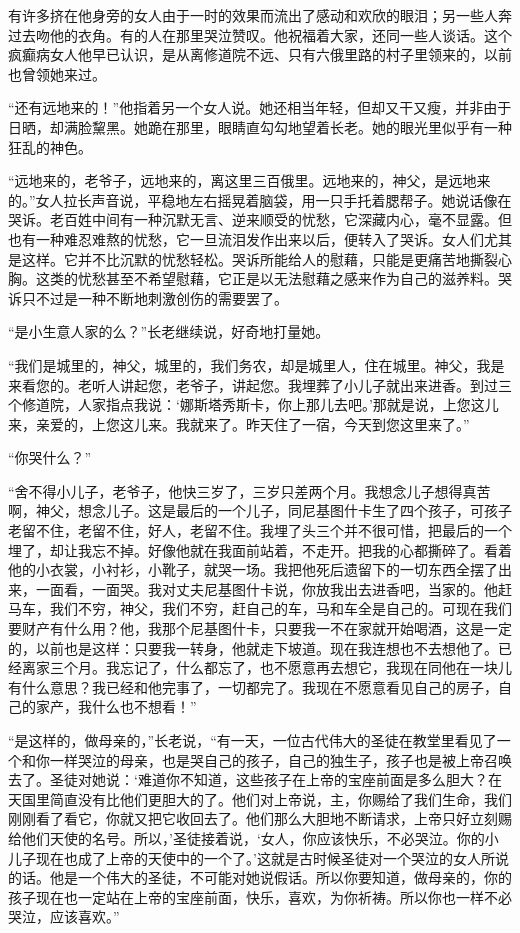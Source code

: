 \par 有许多挤在他身旁的女人由于一时的效果而流出了感动和欢欣的眼泪；另一些人奔过去吻他的衣角。有的人在那里哭泣赞叹。他祝福着大家，还同一些人谈话。这个疯癫病女人他早已认识，是从离修道院不远、只有六俄里路的村子里领来的，以前也曾领她来过。
\par “还有远地来的！”他指着另一个女人说。她还相当年轻，但却又干又瘦，并非由于日晒，却满脸黧黑。她跪在那里，眼睛直勾勾地望着长老。她的眼光里似乎有一种狂乱的神色。
\par “远地来的，老爷子，远地来的，离这里三百俄里。远地来的，神父，是远地来的。”女人拉长声音说，平稳地左右摇晃着脑袋，用一只手托着腮帮子。她说话像在哭诉。老百姓中间有一种沉默无言、逆来顺受的忧愁，它深藏内心，毫不显露。但也有一种难忍难熬的忧愁，它一旦流泪发作出来以后，便转入了哭诉。女人们尤其是这样。它并不比沉默的忧愁轻松。哭诉所能给人的慰藉，只能是更痛苦地撕裂心胸。这类的忧愁甚至不希望慰藉，它正是以无法慰藉之感来作为自己的滋养料。哭诉只不过是一种不断地刺激创伤的需要罢了。
\par “是小生意人家的么？”长老继续说，好奇地打量她。
\par “我们是城里的，神父，城里的，我们务农，却是城里人，住在城里。神父，我是来看您的。老听人讲起您，老爷子，讲起您。我埋葬了小儿子就出来进香。到过三个修道院，人家指点我说：‘娜斯塔秀斯卡，你上那儿去吧。’那就是说，上您这儿来，亲爱的，上您这儿来。我就来了。昨天住了一宿，今天到您这里来了。”
\par “你哭什么？”
\par “舍不得小儿子，老爷子，他快三岁了，三岁只差两个月。我想念儿子想得真苦啊，神父，想念儿子。这是最后的一个儿子，同尼基图什卡生了四个孩子，可孩子老留不住，老留不住，好人，老留不住。我埋了头三个并不很可惜，把最后的一个埋了，却让我忘不掉。好像他就在我面前站着，不走开。把我的心都撕碎了。看着他的小衣裳，小衬衫，小靴子，就哭一场。我把他死后遗留下的一切东西全摆了出来，一面看，一面哭。我对丈夫尼基图什卡说，你放我出去进香吧，当家的。他赶马车，我们不穷，神父，我们不穷，赶自己的车，马和车全是自己的。可现在我们要财产有什么用？他，我那个尼基图什卡，只要我一不在家就开始喝酒，这是一定的，以前也是这样：只要我一转身，他就走下坡道。现在我连想也不去想他了。已经离家三个月。我忘记了，什么都忘了，也不愿意再去想它，我现在同他在一块儿有什么意思？我已经和他完事了，一切都完了。我现在不愿意看见自己的房子，自己的家产，我什么也不想看！”
\par “是这样的，做母亲的，”长老说，“有一天，一位古代伟大的圣徒在教堂里看见了一个和你一样哭泣的母亲，也是哭自己的孩子，自己的独生子，孩子也是被上帝召唤去了。圣徒对她说：‘难道你不知道，这些孩子在上帝的宝座前面是多么胆大？在天国里简直没有比他们更胆大的了。他们对上帝说，主，你赐给了我们生命，我们刚刚看了看它，你就又把它收回去了。他们那么大胆地不断请求，上帝只好立刻赐给他们天使的名号。所以，’圣徒接着说，‘女人，你应该快乐，不必哭泣。你的小儿子现在也成了上帝的天使中的一个了。’这就是古时候圣徒对一个哭泣的女人所说的话。他是一个伟大的圣徒，不可能对她说假话。所以你要知道，做母亲的，你的孩子现在也一定站在上帝的宝座前面，快乐，喜欢，为你祈祷。所以你也一样不必哭泣，应该喜欢。”
